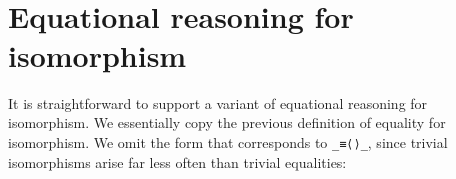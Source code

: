 \begin{fence}
\begin{code}
\AgdaSymbol{(}\AgdaSpace{}%
\AgdaSpace{}%
\AgdaSymbol{(}\AgdaSpace{}%
\AgdaSpace{}%
\AgdaSymbol{)))}\<%
\\
%
\>[8]\AgdaSpace{}%
\AgdaSpace{}%
\AgdaSymbol{(}\AgdaSpace{}%
\AgdaSymbol{)}\AgdaSpace{}%
\AgdaSymbol{(}\AgdaSpace{}%
\AgdaSpace{}%
\AgdaSymbol{(}\AgdaSpace{}%
\AgdaSpace{}%
\AgdaSymbol{))}\AgdaSpace{}%
\<%
\\
\>[8][@{}l@{\AgdaIndent{0}}]%
\>[10]\AgdaSpace{}%
\AgdaSpace{}%
\AgdaSymbol{(}\AgdaSpace{}%
\AgdaSpace{}%
\AgdaSymbol{)}\<%
\\
%
\>[8]\AgdaSpace{}%
\AgdaSpace{}%
\AgdaSpace{}%
\AgdaSpace{}%
\<%
\\
\>[8][@{}l@{\AgdaIndent{0}}]%
\>[10]\<%
\\
%
\>[8]\AgdaSymbol{\}}\<%
\\
\>[4][@{}l@{\AgdaIndent{0}}]%
\>[5]\AgdaSymbol{\}}\<%
\end{code}
\end{fence}

\hypertarget{equational-reasoning-for-isomorphism}{%
\section{Equational reasoning for
isomorphism}\label{equational-reasoning-for-isomorphism}}

It is straightforward to support a variant of equational reasoning for
isomorphism. We essentially copy the previous definition of equality for
isomorphism. We omit the form that corresponds to \texttt{\_≡⟨⟩\_},
since trivial isomorphisms arise far less often than trivial equalities:

